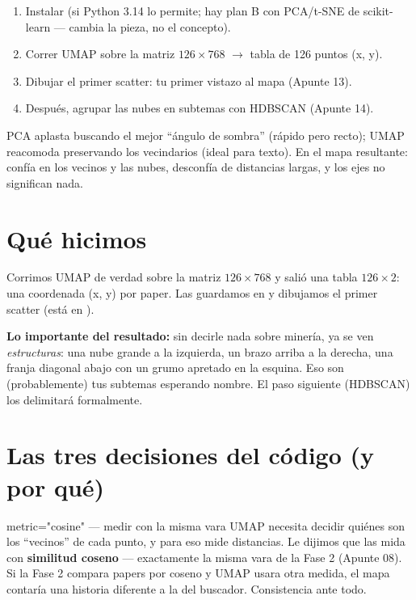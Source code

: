 \documentclass[11pt,a4paper]{article}
\begin{document}
\begin{enumerate}
  \item Instalar  (si Python 3.14 lo permite; hay plan B con PCA/t-SNE
        de scikit-learn — cambia la pieza, no el concepto).
  \item Correr UMAP sobre la matriz $126 \times 768$ $\rightarrow$ tabla de 126 puntos (x, y).
  \item Dibujar el primer scatter: tu primer vistazo al mapa (Apunte 13).
  \item Después, agrupar las nubes en subtemas con HDBSCAN (Apunte 14).
\end{enumerate}

\begin{resumen}
PCA aplasta buscando el mejor ``ángulo de sombra'' (rápido pero recto); UMAP reacomoda
preservando los vecindarios (ideal para texto). En el mapa resultante: confía en los
vecinos y las nubes, desconfía de distancias largas, y los ejes no significan nada.
\end{resumen}
\clearpage
{}
{}

\section{Qué hicimos}

Corrimos UMAP de verdad sobre la matriz $126 \times 768$ y salió una tabla $126 \times 2$:
una coordenada (x, y) por paper. Las guardamos en 
y dibujamos el primer scatter (está en ).

\textbf{Lo importante del resultado:} sin decirle nada sobre minería, ya se ven
\emph{estructuras}: una nube grande a la izquierda, un brazo arriba a la derecha, una franja
diagonal abajo con un grumo apretado en la esquina. Eso son (probablemente) tus subtemas
esperando nombre. El paso siguiente (HDBSCAN) los delimitará formalmente.

\section{Las tres decisiones del código (y por qué)}

\begin{concepto}{metric="cosine" — medir con la misma vara}
UMAP necesita decidir quiénes son los ``vecinos'' de cada punto, y para eso mide distancias.
Le dijimos que las mida con \textbf{similitud coseno} — exactamente la misma vara de la
Fase 2 (Apunte 08). Si la Fase 2 compara papers por coseno y UMAP usara otra medida, el mapa
contaría una historia diferente a la del buscador. Consistencia ante todo.
\end{concepto}
\end{document}
